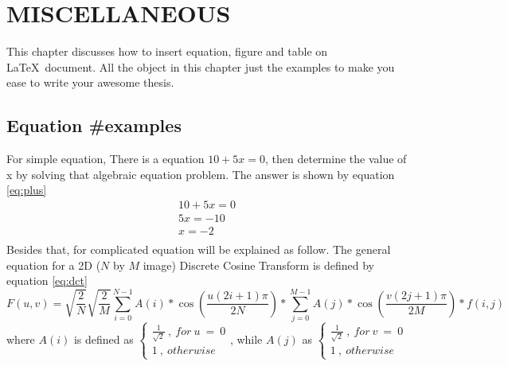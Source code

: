 \chapter{MISCELLANEOUS}\label{app:appendix_A}
This chapter discusses how to insert equation, figure and table on \LaTeX~document. All the object in this chapter just the examples to make you ease to write your awesome thesis.
\section{Equation \#examples}
For simple equation, There is a equation $10 + 5x=0$, then determine the value of x by solving that algebraic equation problem. The answer is shown by equation \ref{eq:plus}
	\begin{equation}
		\label{eq:plus}
			\begin{aligned}
			10 + 5x = 0 \\
			5x = -10\\
			x = -2\\
		\end{aligned}
	\end{equation}
Besides that, for complicated equation will be explained as follow. The general equation for a 2D ($N$ by $M$ image) Discrete Cosine Transform is defined by equation \ref{eq:dct}
	\begin{equation}
	\label{eq:dct}
		F(u,v)=\sqrt{\frac{2}{N}} \sqrt{\frac{2}{M}} \sum_{i=0}^{N-1} A(i)*\cos \left(\frac{u(2i+1)\pi}{2N}\right)*\sum_{j=0}^{M-1} A(j)*\cos \left(\frac{v(2j+1)\pi}{2M}\right)*f(i,j)
	\end{equation}
where $A(i)$ is defined as $\left\{ \begin{aligned} \frac{1}{\sqrt{2}}~,~for~u~=~0\\1~,~otherwise \end{aligned} \right.$, while $A(j)$ as $\left\{ \begin{aligned} \frac{1}{\sqrt{2}}~,~for~v~=~0\\1~,~otherwise \end{aligned} \right.$

